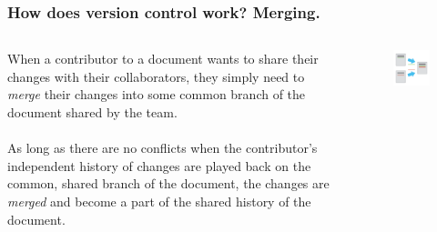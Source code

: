 \documentclass{beamer}
\begin{document}
\begin{frame}
   \frametitle{How does version control work? Merging.}
   \begin{columns}
      \begin{column}{0.5\textwidth}
         When a contributor to a document wants to share their changes 
         with their collaborators, they simply need to \textit{merge} 
         their changes into some common branch of the document shared 
         by the team.
         \\ \ \\
         As long as there are no conflicts when the contributor's 
         independent history of changes are played back on the common, 
         shared branch of the document, the changes are
         \textit{merged} and become a part of the shared history of the
         document.
      \end{column}
      \hfill
      \begin{column}{0.5\textwidth}
         \begin{figure}[htbp]
            \includegraphics[width=1.0\textwidth]{images/merging-changes.png}
         \end{figure}
      \end{column}
   \end{columns}
\end{frame}
\end{document}
